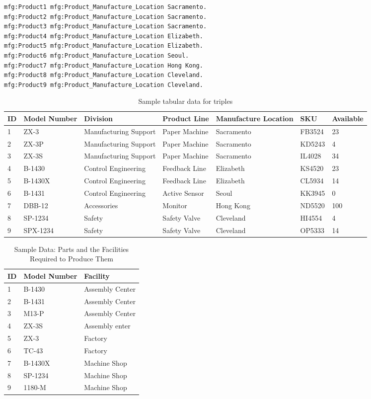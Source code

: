 \begin{lstlisting}
mfg:Product1 mfg:Product_Manufacture_Location Sacramento.
mfg:Product2 mfg:Product_Manufacture_Location Sacramento.
mfg:Product3 mfg:Product_Manufacture_Location Sacramento.
mfg:Product4 mfg:Product_Manufacture_Location Elizabeth.
mfg:Product5 mfg:Product_Manufacture_Location Elizabeth.
mfg:Product6 mfg:Product_Manufacture_Location Seoul.
mfg:Product7 mfg:Product_Manufacture_Location Hong Kong.
mfg:Product8 mfg:Product_Manufacture_Location Cleveland.
mfg:Product9 mfg:Product_Manufacture_Location Cleveland.
\end{lstlisting}


\begin{table}
\caption{
\label{tab:ch9.1}Sample tabular data for triples}
\begin{tabular}{|l l l l l l l|}
\hline
ID&Model Number&Division&Product Line&Manufacture Location&SKU&Available\\
\hline
1&ZX-3&Manufacturing Support&Paper Machine&Sacramento&FB3524&23\\
2&ZX-3P&Manufacturing Support&Paper Machine&Sacramento&KD5243&4\\
3&ZX-3S&Manufacturing Support&Paper Machine&Sacramento&IL4028&34\\
4&B-1430&Control Engineering&Feedback Line&Elizabeth&KS4520&23\\
5&B-1430X&Control Engineering&Feedback Line&Elizabeth&CL5934&14\\
6&B-1431&Control Engineering&Active Sensor&Seoul&KK3945&0\\
7&DBB-12&Accessories&Monitor&Hong Kong&ND5520&100\\
8&SP-1234&Safety&Safety Valve&Cleveland&HI4554&4\\
9&SPX-1234&Safety&Safety Valve&Cleveland&OP5333&14\\
\hline
\end{tabular}
\end{table}

\begin{table}
\caption{\label{tab:ch9.2}Sample Data: Parts and the Facilities Required to Produce Them}
\begin{tabular}{|l l l|}
\hline
ID&Model Number&Facility\\
\hline
1&B-1430&Assembly Center\\
2&B-1431&Assembly Center\\
3&M13-P&Assembly Center\\
4&ZX-3S&Assembly enter\\
5&ZX-3&Factory\\
6&TC-43&Factory\\
7&B-1430X&Machine Shop\\
8&SP-1234&Machine Shop\\
9&1180-M&Machine Shop\\
\hline
\end{tabular}
\end{table}

